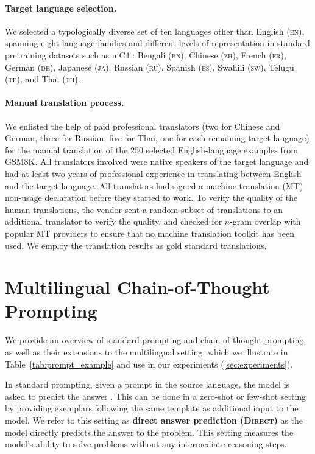 \paragraph{Target language selection.} We selected a typologically diverse set of ten languages other than English (\textsc{en}), spanning eight language families and different levels of representation in standard pretraining datasets such as mC4 \citep{xue-etal-2021-mt5}: Bengali (\textsc{bn}), Chinese (\textsc{zh}), French (\textsc{fr}), German (\textsc{de}), Japanese (\textsc{ja}), Russian (\textsc{ru}), Spanish (\textsc{es}), Swahili (\textsc{sw}), Telugu (\textsc{te}), and Thai (\textsc{th}).

\paragraph{Manual translation process.} We enlisted the help of paid professional translators (two for Chinese and German, three for Russian, five for Thai, one for each remaining target language) for the manual translation of the 250 selected English-language examples from GSM8K. All translators involved were native speakers of the target language and had at least two years of professional experience in translating between English and the target language. All translators had signed a machine translation (MT) non-usage declaration before they started to work. To verify the quality of the human translations, the vendor sent a random subset of translations to an additional translator to verify the quality, and checked for $n$-gram overlap with popular MT providers to ensure that no machine translation toolkit has been used. We employ the translation results as gold standard translations.

\section{Multilingual Chain-of-Thought Prompting}
\label{sec:approaches}

We provide an overview of standard prompting and chain-of-thought prompting, as well as their extensions to the multilingual setting, which we illustrate in Table~\ref{tab:prompt_example} and use in our experiments (\ref{sec:experiments}).

In standard prompting, given a prompt in the source language, the model is asked to predict the answer \citep{brown2020language,schick-schutze-2021-just}. This can be done in a zero-shot or few-shot setting by providing exemplars following the same template as additional input to the model. We refer to this setting as \textbf{direct answer prediction (\textsc{Direct})} as the model directly predicts the answer to the problem. This setting measures the model's ability to solve problems without any intermediate reasoning steps.

